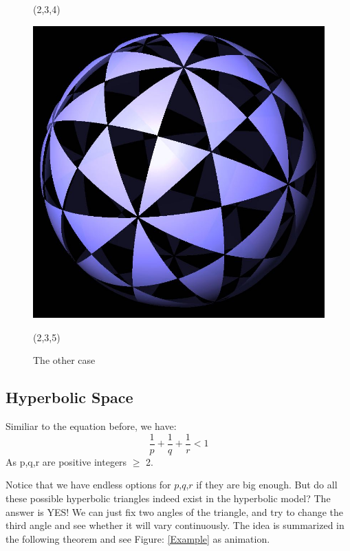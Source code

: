 \documentclass{article}
\begin{document}
\begin{figure}[ht]
\begin{minipage}{0.2\linewidth}
        \caption{(2,3,4)}
        \label{fig:subim10}
    \end{minipage}
    \begin{minipage}{0.2\linewidth}
        \includegraphics[width=0.9\linewidth]{（2，3，5）.jpg}
        \caption{(2,3,5)}
        \label{fig:subim11}
    \end{minipage}
    \caption{The other case}
    \label{fig:image12}
\end{figure}
\subsection{Hyperbolic Space}
Similiar to the equation before, we have:
\[\frac{1}{p} + \frac{1}{q} + \frac{1}{r} < 1\]
As p,q,r are positive integers $\geq$ 2.

Notice that we have endless options for $p$,$q$,$r$ if they are big enough. But do all these possible hyperbolic triangles indeed exist in the hyperbolic model? The answer is YES! We can just fix two angles of the triangle, and try to change the third angle and see whether it will vary continuously. The idea is summarized in the following theorem and see Figure: \ref{Example} as animation.
\end{document}
